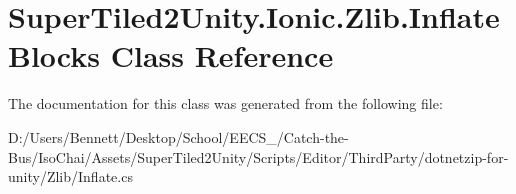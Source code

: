\hypertarget{class_super_tiled2_unity_1_1_ionic_1_1_zlib_1_1_inflate_blocks}{}\section{Super\+Tiled2\+Unity.\+Ionic.\+Zlib.\+Inflate\+Blocks Class Reference}
\label{class_super_tiled2_unity_1_1_ionic_1_1_zlib_1_1_inflate_blocks}


The documentation for this class was generated from the following file\+:\begin{DoxyCompactItemize}
\item 
D\+:/\+Users/\+Bennett/\+Desktop/\+School/\+E\+E\+C\+S\+\_/\+Catch-\/the-\/\+Bus/\+Iso\+Chai/\+Assets/\+Super\+Tiled2\+Unity/\+Scripts/\+Editor/\+Third\+Party/dotnetzip-\/for-\/unity/\+Zlib/Inflate.\+cs\end{DoxyCompactItemize}
